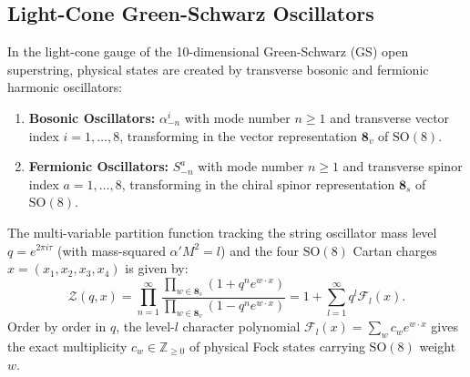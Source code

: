 \documentclass[11pt,a4paper]{article}
\begin{document}
\subsection{Light-Cone Green-Schwarz Oscillators}
In the light-cone gauge of the 10-dimensional Green-Schwarz (GS) open superstring, physical states are created by transverse bosonic and fermionic harmonic oscillators:
\begin{enumerate}
    \item \textbf{Bosonic Oscillators:} $\alpha_{-n}^i$ with mode number $n \ge 1$ and transverse vector index $i = 1, \dots, 8$, transforming in the vector representation $\mathbf{8}_v$ of $\mathrm{SO}(8)$.
    \item \textbf{Fermionic Oscillators:} $S_{-n}^a$ with mode number $n \ge 1$ and transverse spinor index $a = 1, \dots, 8$, transforming in the chiral spinor representation $\mathbf{8}_s$ of $\mathrm{SO}(8)$.
\end{enumerate}
The multi-variable partition function tracking the string oscillator mass level $q = e^{2\pi i \tau}$ (with mass-squared $\alpha' M^2 = l$) and the four $\mathrm{SO}(8)$ Cartan charges $x = (x_1, x_2, x_3, x_4)$ is given by:
\begin{equation}
    \mathcal{Z}(q, x) = \prod_{n=1}^\infty \frac{\prod_{w \in \mathbf{8}_s} \left(1 + q^n e^{w \cdot x}\right)}{\prod_{w \in \mathbf{8}_v} \left(1 - q^n e^{w \cdot x}\right)} = 1 + \sum_{l=1}^\infty q^l \mathcal{F}_l(x).
    \label{eq:partition_fn}
\end{equation}
Order by order in $q$, the level-$l$ character polynomial $\mathcal{F}_l(x) = \sum_w c_w e^{w \cdot x}$ gives the exact multiplicity $c_w \in \mathbb{Z}_{\ge 0}$ of physical Fock states carrying $\mathrm{SO}(8)$ weight $w$.
\end{document}
